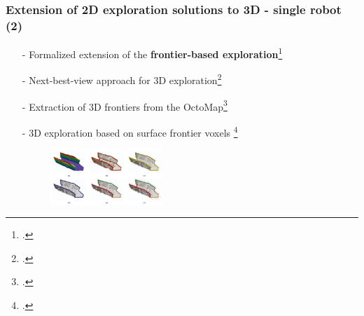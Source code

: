 \begin{frame}
	\frametitle{Extension of 2D exploration solutions to 3D - single robot (2)}
	\begin{itemize}
		\item[-] Formalized extension of the \textbf{frontier-based exploration}\footcite{ShadeNewman2011}
		\item[-] Next-best-view approach for 3D exploration\footcite{Bircher2016}
		
		\item[-] Extraction of 3D frontiers from the OctoMap\footcite{Zhu2015}
		\item[-] 3D exploration based on surface frontier voxels \footcite{Senarathne2016} 
		\begin{figure}
			\centering
			\includegraphics[width=0.4\textwidth]{figures/senarathne}
		\end{figure}
		
		
	\end{itemize}	
\end{frame}
